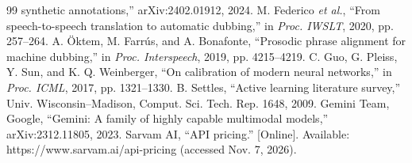 \documentclass[conference]{IEEEtran}
\begin{document}
\begin{thebibliography}{99}
synthetic annotations,'' arXiv:2402.01912, 2024.
 M. Federico \emph{et al.}, ``From speech-to-speech translation to automatic dubbing,'' in
\emph{Proc. IWSLT}, 2020, pp. 257--264.
 A. \"Oktem, M. Farr\'us, and A. Bonafonte, ``Prosodic phrase alignment for machine
dubbing,'' in \emph{Proc. Interspeech}, 2019, pp. 4215--4219.
 C. Guo, G. Pleiss, Y. Sun, and K. Q. Weinberger, ``On calibration of modern neural
networks,'' in \emph{Proc. ICML}, 2017, pp. 1321--1330.
 B. Settles, ``Active learning literature survey,'' Univ. Wisconsin--Madison, Comput. Sci.
Tech. Rep. 1648, 2009.
 Gemini Team, Google, ``Gemini: A family of highly capable multimodal models,'' arXiv:2312.11805,
2023.
 Sarvam AI, ``API pricing.'' [Online]. Available: https://www.sarvam.ai/api-pricing
(accessed Nov. 7, 2026).
\end{thebibliography}
\end{document}
